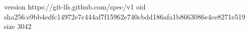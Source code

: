 version https://git-lfs.github.com/spec/v1
oid sha256:e9bb4edfc14972e7c444af7f15962e740cbdd186afa1b8663086e4ce8271e519
size 3042
